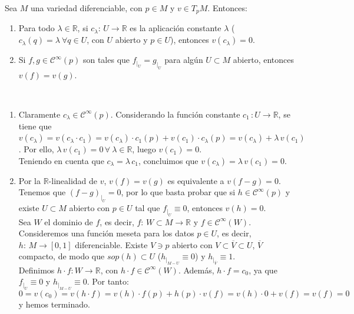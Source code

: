 \begin{prop}
Sea $M$ una variedad diferenciable, con $p \in M$ y $v \in T_pM$. Entonces: \begin{enumerate}
    \item Para todo $\lambda \in \mathbb{R}$, si $c_{\lambda}:\,U \longrightarrow \mathbb{R}$ es la aplicación constante $\lambda$ ($c_{\lambda}(q) = \lambda \:\forall q \in U$, con $U$ abierto y $p \in U$), entonces $v(c_{\lambda})=0$.
    \item Si $f, g \in \mathcal{C}^{\infty}(p)$ son tales que $f_{|_U} = g_{|_U}$ para algún $U \subset M$ abierto, entonces $v(f) = v(g)$. 
\end{enumerate}
\end{prop}
\begin{dem} \,
\begin{enumerate}
    \item Claramente $c_{\lambda} \in \mathcal{C}^{\infty}(p)$. Considerando la función constante $c_1 \, : U \longrightarrow \mathbb{R}$, se tiene que $v(c_{\lambda})= v(c_{\lambda} \cdot c_1) = v(c_{\lambda}) \cdot c_1(p) + v(c_1) \cdot c_{\lambda}(p) = v(c_{\lambda}) + \lambda\,v(c_1)$. Por ello, $\lambda\,v(c_1) = 0 \, \forall \:\lambda \in \mathbb{R}$, luego $v(c_1) = 0$.\\
    Teniendo en cuenta que $c_{\lambda} = \lambda\,c_1$, concluimos que $v(c_{\lambda}) = \lambda\,v(c_1) = 0$.
    \item Por la $\mathbb R$-linealidad de $v$, $v(f) = v(g)$ es equivalente a $v(f-g) = 0$. Tenemos que $(f-g)_{|_U} = 0$, por lo que basta probar que si $h \in \mathcal{C}^{\infty}(p)$ y existe $U \subset M$ abierto con $p \in U$ tal que $f_{|_U} \equiv 0$, entonces $v(h) = 0$.\\
    Sea $W$ el dominio de $f$, es decir, $f:\,W \subset M \longrightarrow \mathbb{R}$ y $f \in \mathcal C^\infty(W)$. Consideremos una función meseta para los datos $p \in U$, es decir, $h:\,M\longrightarrow [0,1]$ diferenciable. Existe $V \ni p$ abierto con $V \subset \overline{V} \subset U$, $\overline{V}$ compacto, de modo que $sop(h) \subset U$ ($h_{|_{M-U}}\equiv 0$) y  $h_{|_{\overline{V}}}\equiv 1$.\\
    Definimos $h\cdot f: W \longrightarrow \mathbb{R}$, con $h \cdot f \in \mathcal{C}^{\infty}(W)$. Además, $h\cdot f = c_0$, ya que $f_{|_U} \equiv 0$ y $h_{|_{M-U}}\equiv 0$. Por tanto:$$0 = v(c_0) = v(h\cdot f) = v(h) \cdot f(p) + h(p) \cdot v(f) = v(h) \cdot 0 + v(f) = v(f) = 0$$ y hemos terminado.
\end{enumerate}
\end{dem}

